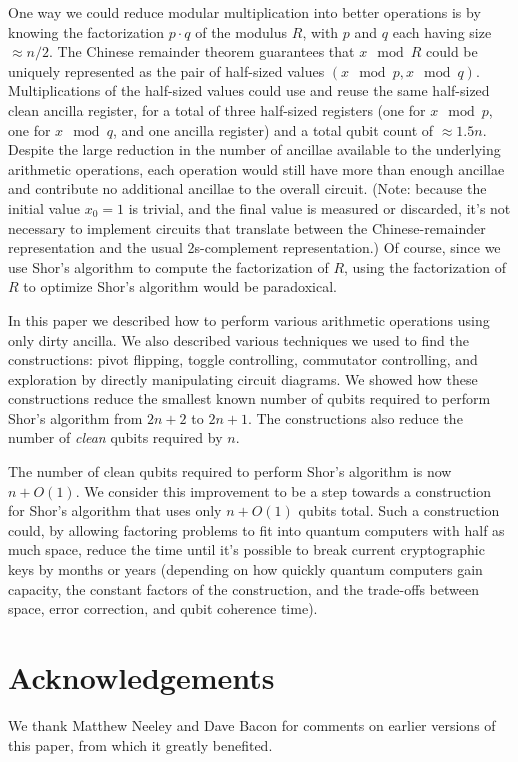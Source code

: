 \documentclass[twocolumn,longbibliography]{quantumarticle}
\begin{document}
One way we could reduce modular multiplication into better operations is by knowing the factorization $p \cdot q$ of the modulus $R$, with $p$ and $q$ each having size $\approx n/2$.
The Chinese remainder theorem guarantees that $x \mod R$ could be uniquely represented as the pair of half-sized values $(x \mod p, x \mod q)$.
Multiplications of the half-sized values could use and reuse the same half-sized clean ancilla register, for a total of three half-sized registers (one for $x \mod p$, one for $x \mod q$, and one ancilla register) and a total qubit count of $\approx 1.5n$.
Despite the large reduction in the number of ancillae available to the underlying arithmetic operations, each operation would still have more than enough ancillae and contribute no additional ancillae to the overall circuit.
(Note: because the initial value $x_0 = 1$ is trivial, and the final value is measured or discarded, it's not necessary to implement circuits that translate between the Chinese-remainder representation and the usual 2s-complement representation.)
Of course, since we use Shor's algorithm to compute the factorization of $R$, using the factorization of $R$ to optimize Shor's algorithm would be paradoxical.

In this paper we described how to perform various arithmetic operations using only dirty ancilla.
We also described various techniques we used to find the constructions: pivot flipping, toggle controlling, commutator controlling, and exploration by directly manipulating circuit diagrams.
We showed how these constructions reduce the smallest known number of qubits required to perform Shor's algorithm from $2n+2$ to $2n+1$.
The constructions also reduce the number of {\em clean} qubits required by $n$.

The number of clean qubits required to perform Shor's algorithm is now $n + O(1)$.
We consider this improvement to be a step towards a construction for Shor's algorithm that uses only $n + O(1)$ qubits total.
Such a construction could, by allowing factoring problems to fit into quantum computers with half as much space, reduce the time until it's possible to break current cryptographic keys by months or years (depending on how quickly quantum computers gain capacity, the constant factors of the construction, and the trade-offs between space, error correction, and qubit coherence time).


\section{Acknowledgements}

We thank Matthew Neeley and Dave Bacon for comments on earlier versions of this paper, from which it greatly benefited.




\end{document}
